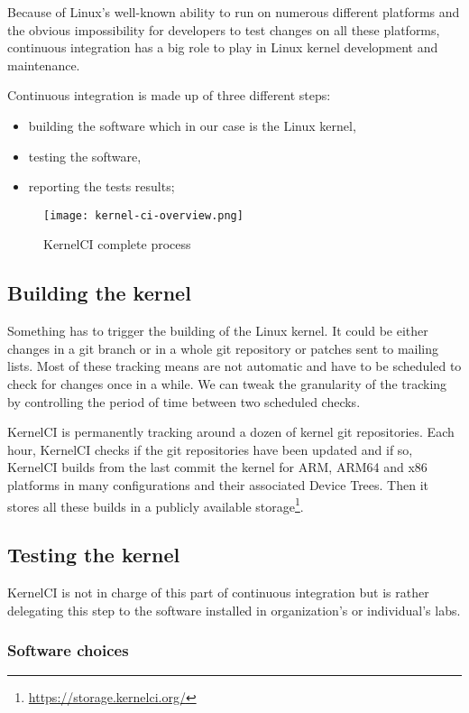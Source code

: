 Because of Linux's well-known ability to run on numerous different platforms and the obvious impossibility for developers to test changes on all these platforms, continuous integration has a big role to play in Linux kernel development and maintenance.

Continuous integration is made up of three different steps:
\begin{itemize}
  \item building the software which in our case is the Linux kernel,
  \item testing the software,
  \item reporting the tests results;
\end{itemize}

\begin{figure}[H]
  \texttt{[image: kernel-ci-overview.png]}
  \caption{KernelCI complete process}
\end{figure}

\subsection{Building the kernel}

Something has to trigger the building of the Linux kernel. It could be either changes in a git branch or in a whole git repository or patches sent to mailing lists. Most of these tracking means are not automatic and have to be scheduled to check for changes once in a while. We can tweak the granularity of the tracking by controlling the period of time between two scheduled checks.

KernelCI is permanently tracking around a dozen of kernel git repositories. Each hour, KernelCI checks if the git repositories have been updated and if so, KernelCI builds from the last commit the kernel for ARM, ARM64 and x86 platforms in many configurations and their associated Device Trees. Then it stores all these builds in a publicly available storage\footnote{\url{https://storage.kernelci.org/}}.

\subsection{Testing the kernel}

KernelCI is not in charge of this part of continuous integration but is rather delegating this step to the software installed in organization's or individual's labs.

\subsubsection{Software choices}

